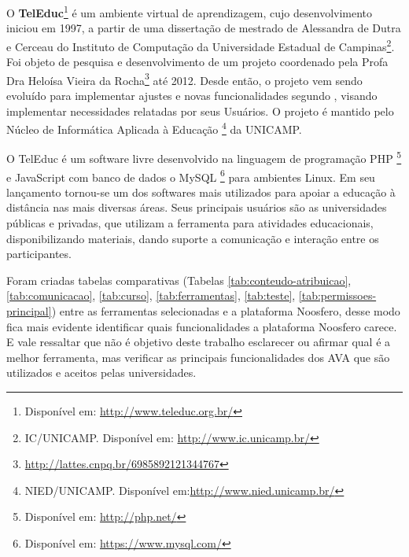 O \textbf{TelEduc}\footnote{Disponível em: \url{http://www.teleduc.org.br/}} é um ambiente virtual de aprendizagem, cujo desenvolvimento iniciou em 1997, a partir de uma dissertação de mestrado de Alessandra de Dutra e Cerceau do Instituto de Computação da Universidade Estadual de Campinas\footnote{IC/UNICAMP. Disponível em: \url{http://www.ic.unicamp.br/}}. Foi objeto de pesquisa e desenvolvimento de um projeto coordenado pela Profa Dra Heloísa Vieira da Rocha\footnote{\url{http://lattes.cnpq.br/6985892121344767}} até 2012. Desde então, o projeto vem sendo evoluído para implementar ajustes e novas funcionalidades segundo \cite{rocha2002ambiente}, visando implementar necessidades relatadas por seus Usuários. O projeto é mantido pelo Núcleo de Informática Aplicada à Educação \footnote{NIED/UNICAMP. Disponível em:\url{http://www.nied.unicamp.br/}} da UNICAMP.

O TelEduc é um software livre desenvolvido na linguagem de programação PHP \footnote{Disponível em: \url{http://php.net/}} e JavaScript com banco de dados o MySQL \footnote{Disponível em: \url{https://www.mysql.com/}} para ambientes Linux. Em seu lançamento tornou-se um dos softwares mais utilizados para apoiar a educação à distância nas mais diversas áreas. Seus principais usuários são as universidades públicas e privadas, que utilizam a ferramenta para atividades educacionais, disponibilizando materiais, dando suporte a comunicação e interação entre os participantes.


Foram criadas tabelas comparativas (Tabelas \ref{tab:conteudo-atribuicao}, \ref{tab:comunicacao}, \ref{tab:curso}, \ref{tab:ferramentas}, \ref{tab:teste}, \ref{tab:permissoes-principal}) entre as ferramentas selecionadas e a plataforma Noosfero, desse modo fica mais evidente identificar quais funcionalidades a plataforma Noosfero carece. E vale ressaltar que não é objetivo deste trabalho esclarecer ou afirmar qual é a melhor ferramenta, mas verificar as principais funcionalidades dos AVA que são utilizados e aceitos pelas universidades.

